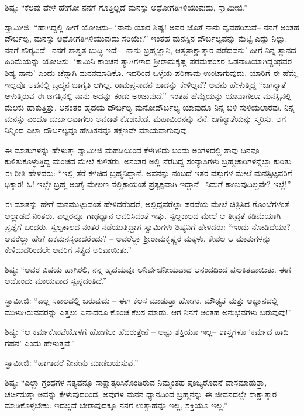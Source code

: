  ಶಿಷ್ಯ: “ಕೆಲವು ವೇಳೆ ಹೇಗೋ ನನಗೆ ಗೊತ್ತಿಲ್ಲದೆ ಮನಸ್ಸು ಅಧೋಗತಿಗಿಳಿಯುವುದು, ಸ್ವಾಮೀಜಿ.” 

\newpage

 ಸ್ವಾಮೀಜಿ: “ಹಾಗಿದ್ದಲ್ಲಿ ಹೀಗೆ ಯೋಚಿಸು– ‘ನಾನು ಯಾರ ಶಿಷ್ಯ! ಅವರ ಜೊತೆ ನಾನು ವ್ಯವಹರಿಸುವೆ– ನನಗೆ ಅಂತಹ ದೌರ್ಬಲ್ಯ, ಮನಸ್ಸು ಅಧೋಗತಿಗಿಳಿಯುವುದು ಸರಿಯೇ?’ ಇಂತಹ ಮನಸ್ಸಿನ ದೌರ್ಬಲ್ಯವನ್ನು ಮೆಟ್ಟಿ ಎದ್ದು ನಿಲ್ಲು. ನನಗೆ ಶೌರ‍್ಯವಿದೆ– ನನಗೆ ಶಾಶ್ವತ ಬುದ್ಧಿ ಇದೆ – ನಾನು ಬ್ರಹ್ಮಜ್ಞಾನಿ, ಆತ್ಮಸಾಕ್ಷಾತ್ಕಾರ ಪಡೆದವನು’ ಹೀಗೆ ನಿನ್ನ ಸ್ಥಾನದ ಹಿರಿಮೆಯನ್ನು ಯೋಚಿಸು. ‘ಕಾಮಿನಿ ಕಾಂಚನ ತ್ಯಾಗಿಗಳಾದ ಶ‍್ರೀರಾಮಕೃಷ್ಣ ಪರಮಹಂಸರ ಒಡನಾಡಿಯಾಗಿದ್ದಂಥವರ ಶಿಷ್ಯ ನಾನು’ ಎಂದು ಚೆನ್ನಾಗಿ ಮನನಮಾಡಿಕೊ. ಇದರಿಂದ ಒಳ್ಳೆಯ ಪರಿಣಾಮ ಉಂಟಾಗುವುದು. ಯಾರಿಗೆ ಈ ಹೆಮ್ಮೆ ಇಲ್ಲವೊ ಅವನಲ್ಲಿ ಬ್ರಹ್ಮನ ಜಾಗೃತಿ ಆಗಿಲ್ಲ. ರಾಮಪ್ರಸಾದನ ಹಾಡನ್ನು ಕೇಳಿಲ್ಲವೆ? ಅವನು ಹೇಳುತ್ತಿದ್ದ “ಜಗನ್ಮಾತೆ ಆಳುತ್ತಿರುವ ಈ ಜಗತ್ತಿನಲ್ಲಿ ನಾನು ಅದನ್ನು ಕಂಡು ಅಂಜುವುದೆ.” ಇಂತಹ ಹೆಮ್ಮೆಯನ್ನು ಯಾವಾಗಲೂ ಮನಸ್ಸಿನಲ್ಲಿ ಮೆಲಕು ಹಾಕುತ್ತಿತ್ತು. ಅನಂತರ ಹೃದಯ ದೌರ್ಬಲ್ಯ ಮನೋದೌರ್ಬಲ್ಯ ಯಾವುದೂ ನಿನ್ನ ಬಳಿ ಸುಳಿಯಲಾರವು. ನಿನ್ನ ಮನಸ್ಸು ಎಂದೂ ದುರ್ಬಲವಾಗಲು ಅವಕಾಶ ಕೊಡಬೇಡ. ಮಹಾವೀರನನ್ನು ನೆನೆ. ಜಗನ್ಮಾತೆಯನ್ನು ಸ್ಮರಿಸು. ಆಗ ನಿನ್ನಿಂದ ಎಲ್ಲಾ ದೌರ್ಬಲ್ಯವೂ ಹೇಡಿತನವೂ ತಕ್ಷಣವೇ ಮಾಯವಾಗುವುವು. 

 ಈ ಮಾತುಗಳನ್ನು ಹೇಳುತ್ತಾ ಸ್ವಾಮೀಜಿ ಮಹಡಿಯಿಂದ ಕೆಳಗಿಳಿದು ಬಂದು ಅಂಗಳದಲ್ಲಿ ತಾವು ದಿನವೂ ಕುಳಿತುಕೊಳ್ಳುತ್ತಿದ್ದ ಮಂಚದ ಮೇಲೆ ಕುಳಿತರು. ಅನಂತರ ಅಲ್ಲಿ ನೆರೆದಿದ್ದ ಸಂನ್ಯಾಸಿಗಳು ಬ್ರಹ್ಮಚಾರಿಗಳನ್ನೆಲ್ಲಾ ಕುರಿತು ಈ ರೀತಿ ಹೇಳಿದರು: “ಇಲ್ಲಿ ತೆರೆ ಕಳಚಿದ ಬ್ರಹ್ಮನಿದ್ದಾನೆ. ಅವನನ್ನು ನಂಬದೆ ಇತರ ವಸ್ತುಗಳ ಮೇಲೆ ಮನಸ್ಸಿಟ್ಟವರಿಗೆ ಧಿಕ್ಕಾರ! ಓ! ಇಲ್ಲೇ ಬ್ರಹ್ಮ ಅಂಗೈ ಮೇಲಣ ನೆಲ್ಲಿಕಾಯಂತೆ ಪ್ರತ್ಯಕ್ಷವಾಗಿ ಇದ್ದಾನೆ– ನಿಮಗೆ ಕಾಣುವುದಿಲ್ಲವೇ? ಇಲ್ಲೆ!” 

 ಈ ಮಾತನ್ನು ಹೇಗೆ ಮನಮುಟ್ಟುವಂತೆ ಹೇಳಿದರೆಂದರೆ, ಅಲ್ಲಿದ್ದವರೆಲ್ಲಾ ಪರದೆಯ ಮೇಲೆ ಚಿತ್ರಿಸಿದ ಗೊಂಬೆಗಳಂತೆ ಅಲ್ಲಾಡದೆ ನಿಂತರು. ಎಲ್ಲರನ್ನೂ ಗಾಢಧ್ಯಾನ ಆವರಿಸಿದಂತೆ ಇತ್ತು. ಸ್ವಲ್ಪಕಾಲದ ಮೇಲೆ ಆ ತೀವ್ರತೆ ಕಡಿಮೆಯಾಗಿ ಪ್ರಜ್ಞೆಗೆ ಬಂದರು. ಸ್ವಲ್ಪಕಾಲದ ನಂತರ ನಡೆಯುತ್ತಿದ್ದಾಗ ಸ್ವಾಮಿಗಳು ಶಿಷ್ಯನಿಗೆ ಹೇಳಿದರು: “ಇಂದು ನೋಡಿದೆಯಾ? ಅವರೆಲ್ಲಾ ಹೇಗೆ ಏಕಮನಸ್ಕರಾದರೆಂದು? – ಅವರೆಲ್ಲಾ ಶ‍್ರೀರಾಮಕೃಷ್ಣರ ಮಕ್ಕಳು. ಕೇವಲ ಆ ಮಾತುಗಳನ್ನು ಕೇಳಿದುದರಿಂದಲೇ ಅವರಿಗೆ ಸತ್ಯದ ಅರಿವಾಯಿತು.” 

 ಶಿಷ್ಯ: “ಅವರ ವಿಷಯ ಹಾಗಿರಲಿ, ನನ್ನ ಹೃದಯವೂ ಅನಿರ್ವಚನೀಯವಾದ ಆನಂದದಿಂದ ಪುಲಕಿತವಾಯಿತು. ಈಗ ಅದೊಂದು ಮಾಯವಾದ ಸ್ವಪ್ನದಂತಿದೆ.” 

 ಸ್ವಾಮೀಜಿ: “ಎಲ್ಲ ಸಕಾಲದಲ್ಲಿ ಬರುವುದು – ಈಗ ಕೆಲಸ ಮಾಡುತ್ತಾ ಹೋಗು. ಮೌಢ್ಯತೆ ಮತ್ತು ಅಜ್ಞಾನದಲ್ಲಿ ಮುಳುಗಿರುವವರನ್ನು ಎತ್ತಲು ಏನಾದರೂ ಕೊಂಚ ಕೆಲಸ ಮಾಡು. ಆಗ ನಿನಗೆ ಅಂತಹ ಅನುಭವಗಳು ಬರುವುವು!” 

\newpage

 ಶಿಷ್ಯ: “ಆ ಕರ್ಮಕೋಟೆಯೊಳಗೆ ಹೋಗಲು ಹೆದರುತ್ತೇನೆ – ಅಷ್ಟು ಶಕ್ತಿಯೂ ಇಲ್ಲ– ಶಾಸ್ತ್ರಗಳೂ ‘ಕರ್ಮದ ಹಾದಿ ಗಹನ’ ಎಂದು ಹೇಳುತ್ತವೆ.” 

 ಸ್ವಾಮೀಜಿ: “ಹಾಗಾದರೆ ನೀನೇನು ಮಾಡಬಯಸುವೆ.” 

 ಶಿಷ್ಯ: “ಎಲ್ಲಾ ಗ್ರಂಥಗಳ ಸತ್ಯವನ್ನೂ ಸಾಕ್ಷಾತ್ಕರಿಸಿಕೊಂಡಿರುವ ನಿಮ್ಮಂತಹ ಪೂಜ್ಯರೊಡನೆ ವಾಸಮಾಡುತ್ತಾ, ಚರ್ಚಿಸುತ್ತಾ ಅವನ್ನು ಕೇಳುವುದರಿಂದ, ಅವುಗಳ ಮನನ ಧ್ಯಾನದಿಂದ ಬ್ರಹ್ಮನನ್ನು ಈ ಜೀವನದಲ್ಲೇ ಸಾಕ್ಷಾತ್ಕಾರ ಮಾಡಿಕೊಳ್ಳಬೇಕು. ಇದಲ್ಲದೆ ಬೇರಾವುದಕ್ಕೂ ನನಗೆ ಉತ್ಸಾಹವೂ ಇಲ್ಲ, ಶಕ್ತಿಯೂ ಇಲ್ಲ.” 

